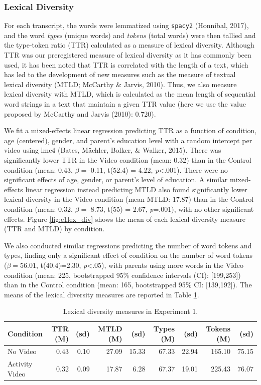 \documentclass[man,floatsintext]{apa6}
\begin{document}
\hypertarget{lexical-diversity}{%
\subsubsection{Lexical Diversity}\label{lexical-diversity}}

For each transcript, the words were lemmatized using \texttt{spacy2} (Honnibal, 2017), and the word \emph{types} (unique words) and \emph{tokens} (total words) were then tallied and the type-token ratio (TTR) calculated as a measure of lexical diversity.
Although TTR was our preregistered measure of lexical diversity as it has commonly been used, it has been noted that TTR is correlated with the length of a text, which has led to the development of new measures such as the measure of textual lexical diversity (MTLD; McCarthy \& Jarvis, 2010).
Thus, we also measure lexical diversity with MTLD, which is calculated as the mean length of sequential word strings in a text that maintain a given TTR value (here we use the value proposed by McCarthy and Jarvis (2010): 0.720).

We fit a mixed-effects linear regression predicting TTR as a function of condition, age (centered), gender, and parent's education level with a random intercept per video using lme4 (Bates, Mächler, Bolker, \& Walker, 2015).
There was significantly lower TTR in the Video condition (mean: 0.32) than in the Control condition (mean: 0.43, \(\beta=\)-0.11, t(52.4) = 4.22, \emph{p}\textless{}.001).
There were no significant effects of age, gender, or parent's level of education.
A similar mixed-effects linear regression instead predicting MTLD also found significantly lower lexical diversity in the Video condition (mean MTLD: 17.87) than in the Control condition (mean: 0.32, \(\beta=\)-8.73, t(55) = 2.67, \emph{p}=.001), with no other significant effects.
Figure \ref{fig:e1lex_div} shows the mean of each lexical diversity measure (TTR and MTLD) by condition.

We also conducted similar regressions predicting the number of word tokens and types, finding only a significant effect of condition on the number of word tokens (\(\beta= 56.01\), t(40.4)=2.30, \emph{p}\textless{}.05), with parents using more words in the Video condition (mean: 225, bootstrapped 95\% confidence intervals (CI): {[}199,253{]}) than in the Control condition (mean: 165, bootstrapped 95\% CI: {[}139,192{]}).
The means of the lexical diversity measures are reported in Table \ref{tab:e1tab}.

\begin{table}[t]

\caption{\label{tab:e1tab}Lexical diversity measures in Experiment 1.}
\centering
\begin{tabular}{l|r|r|r|r|r|r|r|r}
\hline
Condition & TTR (M) & (sd) & MTLD (M) & (sd) & Types (M) & (sd) & Tokens (M) & (sd)\\
\hline
No Video & 0.43 & 0.10 & 27.09 & 15.33 & 67.33 & 22.94 & 165.10 & 75.15\\
\hline
Activity Video & 0.32 & 0.09 & 17.87 & 6.28 & 67.37 & 19.01 & 225.43 & 76.07\\
\hline
\end{tabular}
\end{table}
\end{document}
